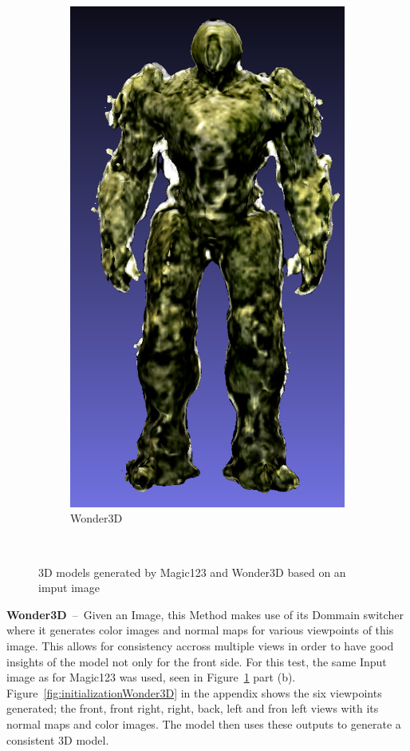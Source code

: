 \begin{figure}[ht]
\begin{subfigure}[b]{0.21\textwidth}
        \includegraphics[width=\textwidth]{etc/a robot made out of plants/wonder3d/wonder3d_plantrobot_model_resized}
        \caption{Wonder3D}
    \end{subfigure}
    \caption{3D models generated by Magic123 and Wonder3D based on an imput image}~\label{fig:inputAndModel}
  \end{figure}


\textbf{Wonder3D}~--~Given an Image, this Method makes use of its Dommain switcher where it generates color images and normal maps for various viewpoints of this image. This allows for consistency accross multiple views in order to have good insights of the model not only for the front side. For this test, the same Input image as for Magic123 was used, seen in Figure~\ref{fig:inputAndModel} part (b). Figure~\ref{fig:initializationWonder3D} in the appendix shows the six viewpoints generated; the front, front right, right, back, left and fron left views with its normal maps and color images. The model then uses these outputs to generate a consistent 3D model. 

